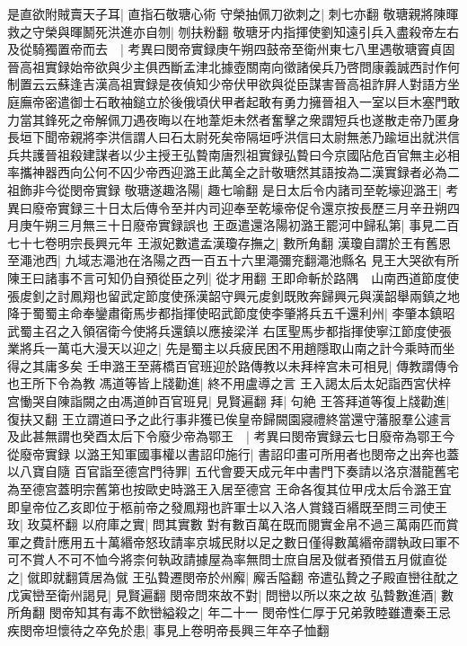 是直欲附賊賣天子耳|{
	直指石敬瑭心術}
守榮抽佩刀欲刺之|{
	刺七亦翻}
敬瑭親將陳暉救之守榮與暉鬭死洪進亦自刎|{
	刎扶粉翻}
敬瑭牙内指揮使劉知遠引兵入盡殺帝左右及從騎獨置帝而去　|{
	考異曰閔帝實録庚午朔四鼓帝至衛州東七八里遇敬瑭竇貞固晉高祖實録始帝欲與少主俱西斷孟津北據壺關南向徵諸侯兵乃啓問康義誠西討作何制置云云蘇逢吉漢高祖實録是夜偵知少帝伏甲欲與從臣謀害晉高祖詐屛人對語方坐庭廡帝密遣御士石敢袖鎚立於後俄頃伏甲者起敢有勇力擁晉祖入一室以巨木塞門敢力當其鋒死之帝解佩刀遇夜晦以在地葦炬未然者奮擊之衆謂短兵也遂散走帝乃匿身長垣下聞帝親將李洪信謂人曰石太尉死矣帝隔垣呼洪信曰太尉無恙乃踰垣出就洪信兵共護晉祖殺建謀者以少主授王弘䞇南唐烈祖實録弘䞇曰今京國阽危百官無主必相率攜神器西向公何不囚少帝西迎潞王此萬全之計敬瑭然其語按為二漢實録者必為二祖飾非今從閔帝實録}
敬瑭遂趣洛陽|{
	趣七喻翻}
是日太后令内諸司至乾壕迎潞王|{
	考異曰廢帝實録三十日太后傳令至并内司迎奉至乾壕帝促令還京按長歷三月辛丑朔四月庚午朔三月無三十日廢帝實録誤也}
王亟遣還洛陽初潞王罷河中歸私第|{
	事見二百七十七卷明宗長興元年}
王淑妃數遣孟漢瓊存撫之|{
	數所角翻}
漢瓊自謂於王有舊恩至澠池西|{
	九域志澠池在洛陽之西一百五十六里澠彌兖翻澠池縣名}
見王大哭欲有所陳王曰諸事不言可知仍自預從臣之列|{
	從才用翻}
王即命斬於路隅　山南西道節度使張䖍釗之討鳳翔也留武定節度使孫漢韶守興元䖍釗既敗奔歸興元與漢韶舉兩鎮之地降于蜀蜀主命奉鑾肅衛馬步都指揮使昭武節度使李肇將兵五千還利州|{
	李肇本鎮昭武蜀主召之入領宿衛今使將兵還鎮以應接梁洋}
右匡聖馬步都指揮使寧江節度使張業將兵一萬屯大漫天以迎之|{
	先是蜀主以兵疲民困不用趙隱取山南之計今乘時而坐得之其庸多矣}
壬申潞王至蔣橋百官班迎於路傳教以未拜梓宫未可相見|{
	傳教謂傳令也王所下令為教}
馮道等皆上牋勸進|{
	終不用盧導之言}
王入謁太后太妃詣西宮伏梓宫慟哭自陳詣闕之由馮道帥百官班見|{
	見賢遍翻}
拜|{
	句絶}
王答拜道等復上牋勸進|{
	復扶又翻}
王立謂道曰予之此行事非獲已俟皇帝歸闕園寢禮終當還守藩服羣公遽言及此甚無謂也癸酉太后下令廢少帝為鄂王　|{
	考異曰閔帝實録云七日廢帝為鄂王今從廢帝實録}
以潞王知軍國事權以書詔印施行|{
	書詔印畫可所用者也閔帝之出奔也蓋以八寶自隨}
百官詣至德宫門待罪|{
	五代會要天成元年中書門下奏請以洛京潛龍舊宅為至德宫蓋明宗舊第也按歐史時潞王入居至德宫}
王命各復其位甲戌太后令潞王宜即皇帝位乙亥即位于柩前帝之發鳳翔也許軍士以入洛人賞錢百緡既至問三司使王玫|{
	玫莫杯翻}
以府庫之實|{
	問其實數}
對有數百萬在既而閱實金帛不過三萬兩匹而賞軍之費計應用五十萬緡帝怒玫請率京城民財以足之數日僅得數萬緡帝謂執政曰軍不可不賞人不可不恤今將柰何執政請據屋為率無問士庶自居及僦者預借五月僦直從之|{
	僦即就翻賃居為僦}
王弘䞇遷閔帝於州廨|{
	廨舌隘翻}
帝遣弘贄之子殿直巒往酖之戊寅巒至衛州謁見|{
	見賢遍翻}
閔帝問來故不對|{
	問巒以所以來之故}
弘䞇數進酒|{
	數所角翻}
閔帝知其有毒不飲巒縊殺之|{
	年二十一}
閔帝性仁厚于兄弟敦睦雖遭秦王忌疾閔帝坦懷待之卒免於患|{
	事見上卷明帝長興三年卒子恤翻}
